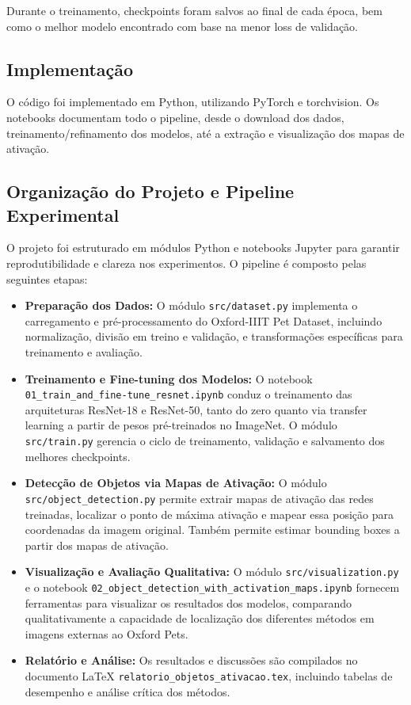\documentclass[%
 reprint,
 amsmath,amssymb,
 aps,
]{revtex4-2}
\begin{document}
Durante o treinamento, checkpoints foram salvos ao final de cada época, bem como o melhor modelo encontrado com base na menor loss de validação. 

\subsection{Implementação}
O código foi implementado em Python, utilizando PyTorch e torchvision. Os notebooks documentam todo o pipeline, desde o download dos dados, treinamento/refinamento dos modelos, até a extração e visualização dos mapas de ativação.

\subsection{Organização do Projeto e Pipeline Experimental}

O projeto foi estruturado em módulos Python e notebooks Jupyter para garantir reprodutibilidade e clareza nos experimentos. O pipeline é composto pelas seguintes etapas:

\begin{itemize}
    \item \textbf{Preparação dos Dados:} O módulo \verb|src/dataset.py| implementa o carregamento e pré-processamento do Oxford-IIIT Pet Dataset, incluindo normalização, divisão em treino e validação, e transformações específicas para treinamento e avaliação.
    \item \textbf{Treinamento e Fine-tuning dos Modelos:} O notebook \verb|01_train_and_fine-tune_resnet.ipynb| conduz o treinamento das arquiteturas ResNet-18 e ResNet-50, tanto do zero quanto via transfer learning a partir de pesos pré-treinados no ImageNet. O módulo \verb|src/train.py| gerencia o ciclo de treinamento, validação e salvamento dos melhores checkpoints.
    \item \textbf{Detecção de Objetos via Mapas de Ativação:} O módulo \verb|src/object_detection.py| permite extrair mapas de ativação das redes treinadas, localizar o ponto de máxima ativação e mapear essa posição para coordenadas da imagem original. Também permite estimar bounding boxes a partir dos mapas de ativação.
    \item \textbf{Visualização e Avaliação Qualitativa:} O módulo \verb|src/visualization.py| e o notebook \verb|02_object_detection_with_activation_maps.ipynb| fornecem ferramentas para visualizar os resultados dos modelos, comparando qualitativamente a capacidade de localização dos diferentes métodos em imagens externas ao Oxford Pets.
    \item \textbf{Relatório e Análise:} Os resultados e discussões são compilados no documento LaTeX \verb|relatorio_objetos_ativacao.tex|, incluindo tabelas de desempenho e análise crítica dos métodos.
\end{itemize}
\end{document}
